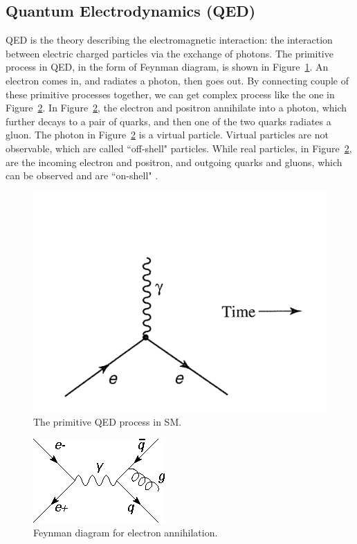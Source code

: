 
\subsection{Quantum Electrodynamics (QED)}

QED is the theory describing the electromagnetic interaction: the 
interaction between electric charged particles via the exchange of photons. 
The primitive process in QED, in the form of Feynman diagram, is shown in 
Figure~\ref{fig:primitiveQED}. An electron comes in, and radiates a photon, then goes out. 
By connecting couple of these primitive processes together, we can get complex process like the one in
Figure~\ref{fig:gluonradiation}. In Figure~\ref{fig:gluonradiation}, the electron and positron annihilate into a
photon, which further decays to a pair of quarks, and then one of the two quarks radiates a gluon. 
The photon in Figure~\ref{fig:gluonradiation} is a virtual particle. Virtual particles are not
observable, which are called ``off-shell" particles. While real particles, in Figure~\ref{fig:gluonradiation}, 
are the incoming electron and positron, and outgoing quarks and gluons, which can be observed and
are ``on-shell" . 
 
\begin{figure}[!htbp]
\centering
\includegraphics[width=.7\textwidth]{figures/primitiveQED.png}
\caption{The primitive QED process in SM. }
\label{fig:primitiveQED}
\end{figure} 

 
\begin{figure}[!htbp]
\centering
\includegraphics[width=.7\textwidth]{figures/Radiate_gluon.png}
\caption{Feynman diagram for electron annihilation.}
\label{fig:gluonradiation}
\end{figure} 


